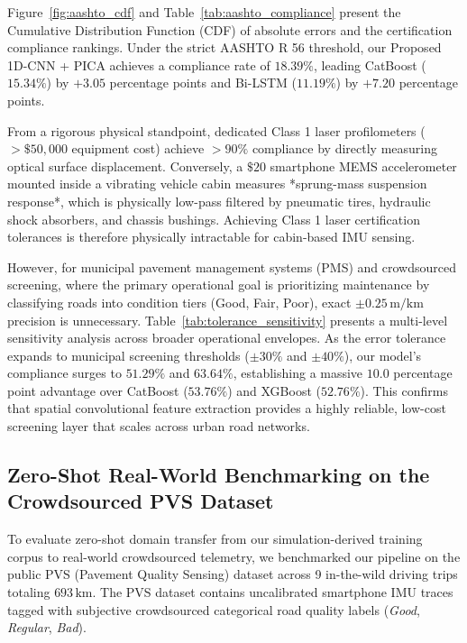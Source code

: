 \documentclass[conference]{IEEEtran}
\begin{document}
Figure~\ref{fig:aashto_cdf} and Table~\ref{tab:aashto_compliance} present the Cumulative Distribution Function (CDF) of absolute errors and the certification compliance rankings. Under the strict AASHTO R 56 threshold, our Proposed 1D-CNN + PICA achieves a compliance rate of $18.39\%$, leading CatBoost ($15.34\%$) by $+3.05$ percentage points and Bi-LSTM ($11.19\%$) by $+7.20$ percentage points. 

From a rigorous physical standpoint, dedicated Class 1 laser profilometers ($>\$50,000$ equipment cost) achieve $>90\%$ compliance by directly measuring optical surface displacement. Conversely, a $\$20$ smartphone MEMS accelerometer mounted inside a vibrating vehicle cabin measures *sprung-mass suspension response*, which is physically low-pass filtered by pneumatic tires, hydraulic shock absorbers, and chassis bushings. Achieving Class 1 laser certification tolerances is therefore physically intractable for cabin-based IMU sensing. 

However, for municipal pavement management systems (PMS) and crowdsourced screening, where the primary operational goal is prioritizing maintenance by classifying roads into condition tiers (Good, Fair, Poor), exact $\pm 0.25\,\text{m/km}$ precision is unnecessary. Table~\ref{tab:tolerance_sensitivity} presents a multi-level sensitivity analysis across broader operational envelopes. As the error tolerance expands to municipal screening thresholds ($\pm 30\%$ and $\pm 40\%$), our model's compliance surges to $51.29\%$ and $63.64\%$, establishing a massive $10.0$ percentage point advantage over CatBoost ($53.76\%$) and XGBoost ($52.76\%$). This confirms that spatial convolutional feature extraction provides a highly reliable, low-cost screening layer that scales across urban road networks.

\subsection{Zero-Shot Real-World Benchmarking on the Crowdsourced PVS Dataset}
\label{sec:eval_pvs}

To evaluate zero-shot domain transfer from our simulation-derived training corpus to real-world crowdsourced telemetry, we benchmarked our pipeline on the public PVS (Pavement Quality Sensing) dataset across 9 in-the-wild driving trips totaling $693\,\text{km}$. The PVS dataset contains uncalibrated smartphone IMU traces tagged with subjective crowdsourced categorical road quality labels (\textit{Good}, \textit{Regular}, \textit{Bad}).
\end{document}

